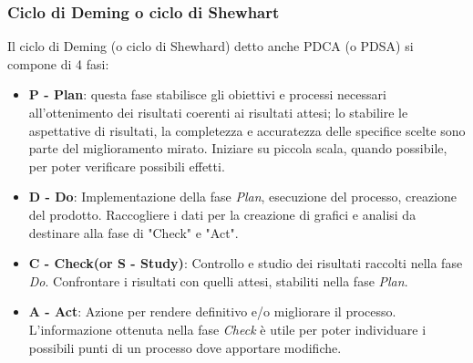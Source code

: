  \subsubsection{Ciclo di Deming o ciclo di Shewhart}
  Il ciclo di Deming (o ciclo di Shewhard) detto anche PDCA (o PDSA) si compone di 4 fasi:
  \begin{itemize}
    \item \textbf{P - Plan}: questa fase stabilisce gli obiettivi e processi necessari all'ottenimento dei risultati coerenti ai risultati attesi;
    lo stabilire le aspettative di risultati, la completezza e accuratezza delle specifice scelte sono parte del miglioramento mirato.
    Iniziare su piccola scala, quando possibile, per poter verificare possibili effetti.
    \item \textbf{D - Do}: Implementazione della fase \emph{Plan}, esecuzione del processo, creazione del prodotto.
    Raccogliere i dati per la creazione di grafici e analisi da destinare alla fase di "Check" e "Act".
    \item \textbf{C - Check(or S - Study)}: Controllo e studio dei risultati raccolti nella fase \emph{Do}. Confrontare i risultati con quelli attesi, stabiliti nella fase \emph{Plan}.
    \item \textbf{A - Act}: Azione per rendere definitivo e/o migliorare il processo. L'informazione ottenuta nella fase \emph{Check} è utile per poter individuare i possibili punti di un processo dove apportare modifiche.
  \end{itemize}
